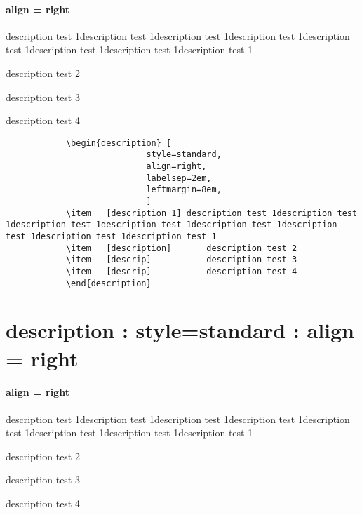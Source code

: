 			\paragraph{ align = right }
			\begin{description}	[
							style=standard, 
							align=right,
							labelsep=2em,
							leftmargin=8em,
							]
			\item	[description 1]	description test 1description test 1description test 1description test 1description test 1description test 1description test 1description test 1
			\item	[description]		description test 2
			\item	[descrip]			description test 3
			\item	[descrip]			description test 4
			\end{description}

		\begin{mdframed}[style=code_document, frametitle={code}]
			\begin{verbatim}
			\begin{description}	[
							style=standard, 
							align=right,
							labelsep=2em,
							leftmargin=8em,
							]
			\item	[description 1]	description test 1description test 1description test 1description test 1description test 1description test 1description test 1description test 1
			\item	[description]		description test 2
			\item	[descrip]			description test 3
			\item	[descrip]			description test 4
			\end{description}
			\end{verbatim}
		\end{mdframed}


	\section{description : style=standard : align = right}

			\paragraph{ align = right }
			\begin{description}	[
							style=standard, 
							align=right,
							labelwidth=8em,
							labelsep=2em,
							leftmargin=10em,
							]
			\item	[description 1]	description test 1description test 1description test 1description test 1description test 1description test 1description test 1description test 1
			\item	[description]		description test 2
			\item	[descrip]			description test 3
			\item	[descrip]			description test 4
			\end{description}
			
